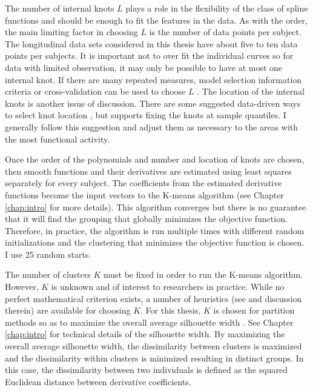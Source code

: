 The number of internal knots $L$ plays a role in the flexibility of the class of spline functions and should be enough to fit the features in the data. As with the order, the main limiting factor in choosing $L$ is the number of data points per subject. The longitudinal data sets considered in this thesis have about five to ten data points per subjects. It is important not to over fit the individual curves so for data with limited observation, it may only be possible to have at most one internal knot. If there are many repeated measures, model selection information criteria or cross-validation can be used to choose $L$ \cite{rice2001}. The location of the internal knots is another issue of discussion. There are some suggested data-driven ways to select knot location \cite{shanggang2001}, but \textcite{ruppert2002} supports fixing the knots at sample quantiles. I generally follow this suggestion and adjust them as necessary to the areas with the most functional activity. 

Once the order of the polynomials and number and location of knots are chosen, then smooth functions and their derivatives are estimated using least squares separately for every subject. The coefficients from the estimated derivative functions become the input vectors to the K-means algorithm (see Chapter \ref{chap:intro} for more details). This algorithm converges but there is no guarantee that it will find the grouping that globally minimizes the objective function. Therefore, in practice, the algorithm is run multiple times with different random initializations and the clustering that minimizes the objective function is chosen. I use 25 random starts.

The number of clusters $K$ must be fixed in order to run the K-means algorithm. However, $K$ is unknown and of interest to researchers in practice. While no perfect mathematical criterion exists, a number of heuristics (see \cite{tibshirani2001} and discussion therein) are available for choosing $K$. For this thesis, $K$ is chosen for partition methods so as to maximize the overall average silhouette width \cite{rousseeuw1987}. See Chapter \ref{chap:intro} for technical details of the silhouette width. By maximizing the overall average silhouette width, the dissimilarity between clusters is maximized and the dissimilarity within clusters is minimized resulting in distinct groups. In this case, the dissimilarity between two individuals is defined as the squared Euclidean distance between derivative coefficients.

